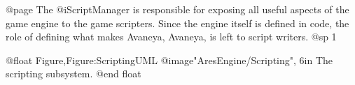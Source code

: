 @page 
The @i{ScriptManager} is responsible for exposing all useful aspects of the game engine to the game scripters. Since the engine itself is defined in code, the role of defining what makes Avaneya, Avaneya, is left to script writers.
@sp 1

@float Figure,Figure:ScriptingUML
@image{"AresEngine/Scripting", 6in}
The scripting subsystem.
@end float

